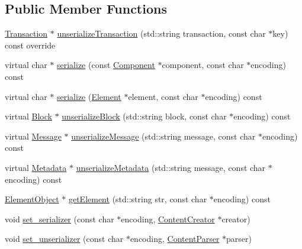 \subsection*{Public Member Functions}
\begin{DoxyCompactItemize}
\item 
\mbox{\hyperlink{classTransaction}{Transaction}} $\ast$ \mbox{\hyperlink{classCustomSerializer_abff58f1a955c2f399127b7e3cae23223}{unserialize\+Transaction}} (std\+::string transaction, const char $\ast$key) const override
\item 
virtual char $\ast$ \mbox{\hyperlink{classSerializer_a5cfe31eb70f4d0c92f2d68c22f39e885}{serialize}} (const \mbox{\hyperlink{classComponent}{Component}} $\ast$component, const char $\ast$encoding) const
\item 
virtual char $\ast$ \mbox{\hyperlink{classSerializer_a38bec517fb3b3cc0778c75b807cb930c}{serialize}} (\mbox{\hyperlink{classElement}{Element}} $\ast$element, const char $\ast$encoding) const
\item 
virtual \mbox{\hyperlink{classBlock}{Block}} $\ast$ \mbox{\hyperlink{classSerializer_a423fb7c43ca9c23e07000dba0c5a432a}{unserialize\+Block}} (std\+::string block, const char $\ast$encoding) const
\item 
virtual \mbox{\hyperlink{classMessage}{Message}} $\ast$ \mbox{\hyperlink{classSerializer_a1d16df9f35a7580da06a497dfbddffe8}{unserialize\+Message}} (std\+::string message, const char $\ast$encoding) const
\item 
virtual \mbox{\hyperlink{classMetadata}{Metadata}} $\ast$ \mbox{\hyperlink{classSerializer_a64b858f0c2968e888cf796b6f09eed7b}{unserialize\+Metadata}} (std\+::string message, const char $\ast$encoding) const
\item 
\mbox{\hyperlink{classElementObject}{Element\+Object}} $\ast$ \mbox{\hyperlink{classSerializer_ab3bcdbd49167109de13e03878337018a}{get\+Element}} (std\+::string str, const char $\ast$encoding) const
\item 
void \mbox{\hyperlink{classSerializer_a0258559787f09d3a7bfe6bb1c41cc118}{set\+\_\+serializer}} (const char $\ast$encoding, \mbox{\hyperlink{classContentCreator}{Content\+Creator}} $\ast$creator)
\item 
void \mbox{\hyperlink{classSerializer_adf32dca6325e4a613c4c7ba48a3de244}{set\+\_\+unserializer}} (const char $\ast$encoding, \mbox{\hyperlink{classContentParser}{Content\+Parser}} $\ast$parser)
\end{DoxyCompactItemize}
